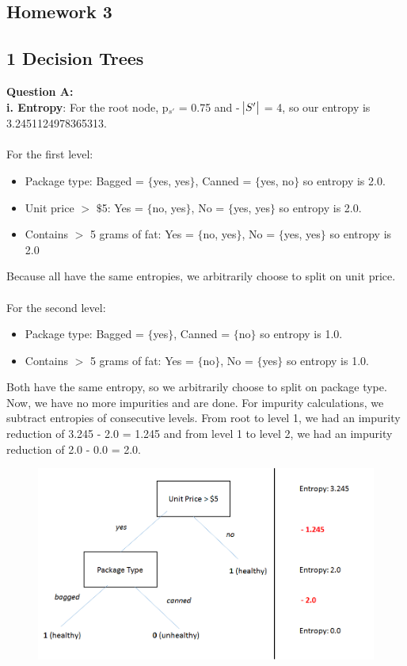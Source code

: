 \documentclass[12 pt]{article}
\begin{document}
	\begin{center}
		\section*{Homework 3}
	\end{center}
	
	
	\subsection*{1 Decision Trees}	
	\noindent\textbf{Question A:}  \\
	\noindent \textbf{i. Entropy}: For the root node, p$_{s'}$ = 0.75 and - $\abs{S'}$ = 4, so our entropy is 3.2451124978365313. \\ \\
	For the first level: 
	\begin{itemize}
		\item Package type: Bagged = $\{$yes, yes$\}$, Canned = $\{$yes, no$\}$ so entropy is 2.0.
		\item Unit price $>$ $\$$5: Yes = $\{$no, yes$\}$, No = $\{$yes, yes$\}$ so entropy is 2.0.
		\item Contains $>$ 5 grams of fat: Yes = $\{$no, yes$\}$, No = $\{$yes, yes$\}$ so entropy is 2.0
	\end{itemize}
	Because all have the same entropies, we arbitrarily choose to split on unit price.  \\ \\
	
	For the second level: 
	\begin{itemize}
		\item Package type: Bagged = $\{$yes$\}$, Canned = $\{$no$\}$ so entropy is 1.0.
		\item Contains $>$ 5 grams of fat: Yes = $\{$no$\}$, No = $\{$yes$\}$ so entropy is 1.0.
	\end{itemize}
	Both have the same entropy, so we arbitrarily choose to split on package type. Now, we have no more impurities and are done. For impurity calculations, we subtract entropies of consecutive levels. From root to level 1, we had an impurity reduction of 3.245 - 2.0 = 1.245 and from level 1 to level 2, we had an impurity reduction of 2.0 - 0.0 = 2.0. 
	
	\begin{figure}[H]
	\includegraphics[width=17cm]{tree1}
	\end{figure}
	
\end{document}
